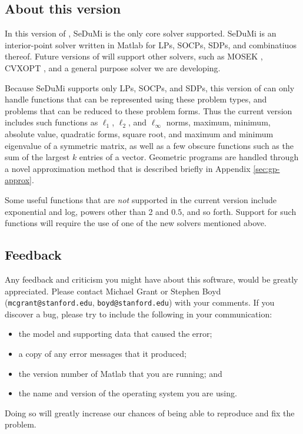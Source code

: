 \documentclass[12pt]{article}
\begin{document}
\subsection{About this version}
\label{sec:version}

In this version of \cvx,
SeDuMi \cite{Stu:99} is the only core solver supported.
SeDuMi is an interior-point solver written in Matlab for 
LPs, SOCPs, SDPs, and combinatiuos thereof.
Future versions of \cvx will support other solvers, such as
MOSEK \cite{MOSEK}, CVXOPT \cite{CVXOPT}, 
and a general purpose solver we are developing.

Because SeDuMi supports only LPs, SOCPs, and SDPs, this
version of \cvx can only handle functions that can be represented
using these problem types, and problems that can be reduced to 
these problem forms. Thus the current version includes such
functions as $\ell_1$, $\ell_2$,
and $\ell_\infty$ norms, maximum, minimum, absolute value,
quadratic forms, square root,
and maximum and minimum eigenvalue of a symmetric matrix,
as well as a few obscure functions such as the 
sum of the largest $k$ entries of a vector.
Geometric programs are handled through a novel approximation
method that is described briefly in Appendix \ref{sec:gp-approx}.

Some useful functions that are \emph{not} supported in
the current version include
exponential and log, powers other than 2 and $0.5$, and
so forth. Support for such functions will require the use
of one of the new solvers mentioned above.

\subsection{Feedback}
\label{sec:feedback}

Any feedback and criticism you might
have about this software, would be greatly appreciated.
Please contact Michael Grant or Stephen Boyd 
(\texttt{mcgrant@stanford.edu}, \texttt{boyd@stanford.edu}) with your comments. If
you discover a bug, please try to include the following in your communication:
\begin{itemize}
\item the \cvx model and supporting data that caused the error;
\item a copy of any error messages that it produced;
\item the version number of Matlab that you are running; and
\item the name and version of the operating system you are using.
\end{itemize}
Doing so will greatly increase our chances of being able to reproduce and fix the problem.
\end{document}
